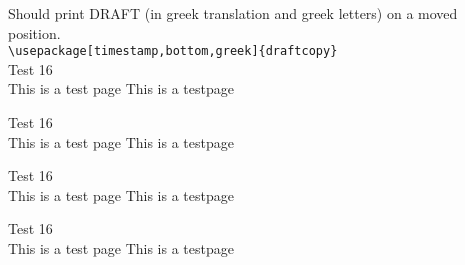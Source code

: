 \documentclass[a4paper,greek]{article}
\newcommand{\xx}{
Test 16\\This is a test page \thepage \vfill
This is a testpage \thepage \newpage
}
\begin{document}
Should print DRAFT (in greek translation and greek letters)
on a moved position.\\
\verb|\usepackage[timestamp,bottom,greek]{draftcopy}|\\
\xx\xx\xx\xx
\end{document}

